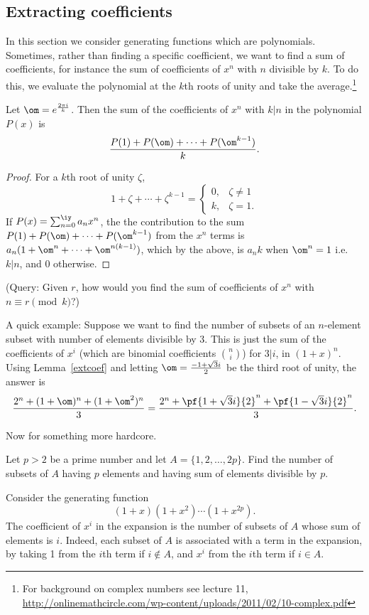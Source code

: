 \subsection{Extracting coefficients}
In this section we consider generating functions which are polynomials. 
Sometimes, rather than finding a specific coefficient, we want to find a sum of coefficients, for instance the sum of coefficients of $x^n$ with $n$ divisible by $k$. To do this, we evaluate the polynomial at the $k$th roots of unity and take the average.\footnote{For background on complex numbers see lecture 11, \url{http://onlinemathcircle.com/wp-content/uploads/2011/02/10-complex.pdf}}
\begin{lem}\label{extcoef}
Let $\om=e^{\frac{2\pi i}{k}}$. Then the sum of the coefficients of $x^n$ with $k|n$ in the polynomial $P(x)$ is
\[
\frac{P(1)+P(\om)+\cdots +P(\om^{k-1})}{k}.
\]
\end{lem}
\begin{proof}
For a $k$th root of unity $\zeta$,
\[1+\zeta+\cdots +\zeta^{k-1}=\begin{cases}
0,&\zeta\ne 1\\
k,&\zeta=1.
\end{cases}\]
If $P(x)=\sum_{n=0}^{\iy} a_nx^n$, the the contribution to the sum $P(1)+P(\om)+\cdots +P(\om^{k-1})$ from the $x^n$ terms is $a_n(1+\om^n+\cdots +\om^{n(k-1)})$, which by the above, is $a_nk$ when $\om^n=1$ i.e. $k|n$, and 0 otherwise.
\end{proof}
(Query: Given $r$, how would you find the sum of coefficients of $x^n$ with $n\equiv r\pmod{k}$?)

A quick example: Suppose we want to find the number of subsets of an $n$-element subset with number of elements divisible by 3. This is just the sum of the coefficients of $x^i$ (which are binomial coefficients $\binom ni$) for $3|i$, in $(1+x)^n$. Using Lemma~\ref{extcoef} and letting $\om=\frac{-1+\sqrt 3 i}{2}$ be the third root of unity, the answer is
\[
\frac{2^n+(1+\om)^n+(1+\om^2)^n}{3}=\frac{2^n+\pf{1+\sqrt 3i}{2}^n+\pf{1-\sqrt 3i}{2}^n}{3}.
\]

Now for something more hardcore.
\begin{ex}[IMO 1995/6]\label{imo95-6}
Let $p>2$ be a prime number and let $A=\{1,2,\ldots, 2p\}$. Find the number of subsets of $A$ having $p$ elements and having sum of elements divisible by $p$.
\end{ex}
Consider the generating function
\[
(1+x)(1+x^2)\cdots (1+x^{2p}).
\]
The coefficient of $x^i$ in the expansion is the number of subsets of $A$ whose sum of elements is $i$. Indeed, each subset of $A$ is associated with a term in the expansion, by taking 1 from the $i$th term if $i\nin A$, and $x^i$ from the $i$th term if $i\in A$.

